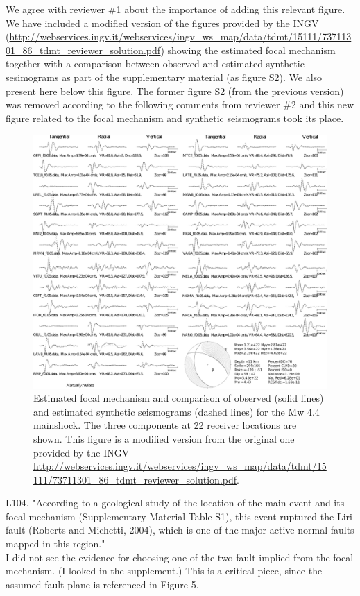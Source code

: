 \documentclass[10pt]{extarticle}
\begin{document}
\begin{Answer}
We agree with reviewer \#1 about the importance of adding this relevant figure. We have included a modified version of the figures provided by the INGV (\url{http://webservices.ingv.it/webservices/ingv_ws_map/data/tdmt/15111/73711301_86_tdmt_reviewer_solution.pdf}) showing the estimated focal mechanism together with a comparison between observed and estimated synthetic sesimograms as part of the supplementary material (as figure S2). We also present here below this figure. The former figure S2 (from the previous version) was removed according to the following comments from reviewer \#2 and this new figure related to the focal mechanism and synthetic seismograms took its place.
\begin{figure}[!h]
\includegraphics[width=1\linewidth]{S2_Focal_synthetics}
\caption{Estimated focal mechanism and comparison of observed (solid lines) and estimated synthetic seismograms (dashed lines) for the Mw 4.4 mainshock. The three components at 22 receiver locations are shown. This figure is a modified version from the original one provided by the INGV \url{http://webservices.ingv.it/webservices/ingv_ws_map/data/tdmt/15111/73711301_86_tdmt_reviewer_solution.pdf}.}
\label{fig:S2_focal_mechanism}
\end{figure}
 \WorkInProgressRevTask
\end{Answer}
%
%



\begin{ReviewerComment}{1}
\noindent 
L104. "According to a geological study of the location of the main event and its focal mechanism (Supplementary Material Table S1), this event ruptured the Liri fault (Roberts and Michetti, 2004), which is one of the major active normal faults mapped in this region." \\

I did not see the evidence for choosing one of the two fault implied from the focal mechanism. (I looked in the supplement.) This is a critical piece, since the assumed fault plane is referenced in Figure 5.
\end{ReviewerComment}
\end{document}

